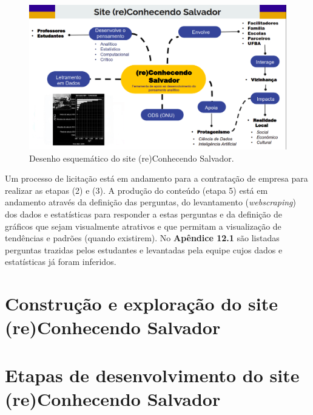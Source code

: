 \documentclass[
]{book}
\begin{document}
\begin{figure}
\includegraphics[width=18.97in]{images/mapaconceitualressa} \caption{Desenho esquemático do site (re)Conhecendo Salvador.}\label{fig:recossa}
\end{figure}

Um processo de licitação está em andamento para a contratação de empresa para realizar as etapas (2) e (3). A produção do conteúdo (etapa 5) está em andamento através da definição das perguntas, do levantamento (\emph{webscraping}) dos dados e estatísticas para responder a estas perguntas e da definição de gráficos que sejam visualmente atrativos e que permitam a visualização de tendências e padrões (quando existirem). No \textbf{Apêndice 12.1} são listadas perguntas trazidas pelos estudantes e levantadas pela equipe cujos dados e estatísticas já foram inferidos.

\hypertarget{construuxe7uxe3o-e-explorauxe7uxe3o-do-site-reconhecendo-salvador}{%
\section{Construção e exploração do site (re)Conhecendo Salvador}\label{construuxe7uxe3o-e-explorauxe7uxe3o-do-site-reconhecendo-salvador}}

\hypertarget{etapas-de-desenvolvimento-do-site-reconhecendo-salvador}{%
\section{Etapas de desenvolvimento do site (re)Conhecendo Salvador}\label{etapas-de-desenvolvimento-do-site-reconhecendo-salvador}}
\end{document}
